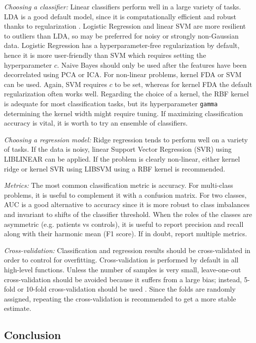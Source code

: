 \documentclass[utf8]{frontiersSCNS} %
\newcommand{\ttt}[1]{\texttt{#1}}
\begin{document}
\textit{Choosing a classifier:} Linear classifiers perform well in a large variety of tasks. LDA is a good default model, since it is computationally efficient and robust thanks to regularization \citep{Blankertz2011}. Logistic Regression and linear SVM are more resilient to outliers than LDA, so may be preferred for noisy or strongly non-Gaussian data. Logistic Regression has a hyperparameter-free regularization by default, hence it is more user-friendly than SVM which requires setting the hyperparameter $c$. Naive Bayes should only be used after the features have been  decorrelated using PCA or ICA. For non-linear problems, kernel FDA or SVM can be used. Again, SVM requires $c$ to be set, whereas for kernel FDA the default regularization often works well. Regarding the choice of a kernel, the RBF kernel is adequate for most classification tasks, but its hyperparameter \ttt{gamma} determining the kernel width might require tuning. If maximizing classification accuracy is vital, it is worth to try an ensemble of classifiers.

\textit{Choosing a regression model:} Ridge regression tends to perform well on a variety of tasks. If the data is noisy, linear Support Vector Regression (SVR) using LIBLINEAR can be applied. If the problem is clearly non-linear, either kernel ridge or kernel SVR using LIBSVM using a RBF kernel is recommended.

\textit{Metrics:} The most common classification metric is accuracy. For multi-class problems, it is useful to complement it with a confusion matrix. For two classes, AUC is a good alternative to accuracy since it is more robust to class imbalances and invariant to shifts of the classifier threshold. When the roles of the  classes are asymmetric (e.g. patients vs controls), it is useful to report precision and recall along with their harmonic mean (F1 score). If in doubt, report multiple metrics.

\textit{Cross-validation:} Classification and regression results should be cross-validated in order to control for overfitting. Cross-validation is performed by default in all high-level functions. Unless the number of samples is very small, leave-one-out cross-validation should be avoided because it suffers from a large bias; instead, 5-fold or 10-fold cross-validation should be used \citep{James2013}. Since the folds are randomly assigned, repeating the cross-validation is recommended to get a more stable estimate.

\subsection{Conclusion}
\end{document}
